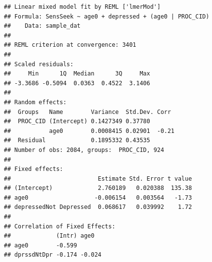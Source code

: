 \documentclass[]{article}
\begin{document}
\begin{verbatim}
## Linear mixed model fit by REML ['lmerMod']
## Formula: SensSeek ~ age0 + depressed + (age0 | PROC_CID)
##    Data: sample_dat
## 
## REML criterion at convergence: 3401
## 
## Scaled residuals: 
##     Min      1Q  Median      3Q     Max 
## -3.3686 -0.5094  0.0363  0.4522  3.1406 
## 
## Random effects:
##  Groups   Name        Variance  Std.Dev. Corr 
##  PROC_CID (Intercept) 0.1427349 0.37780       
##           age0        0.0008415 0.02901  -0.21
##  Residual             0.1895332 0.43535       
## Number of obs: 2084, groups:  PROC_CID, 924
## 
## Fixed effects:
##                         Estimate Std. Error t value
## (Intercept)             2.760189   0.020388  135.38
## age0                   -0.006154   0.003564   -1.73
## depressedNot Depressed  0.068617   0.039992    1.72
## 
## Correlation of Fixed Effects:
##             (Intr) age0  
## age0        -0.599       
## dprssdNtDpr -0.174 -0.024
\end{verbatim}

\normalsize
\end{document}
